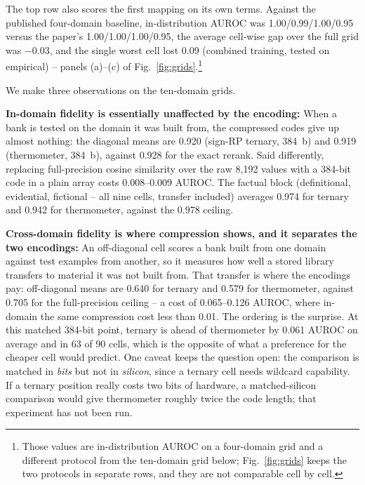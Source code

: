 \documentclass[conference]{IEEEtran}
\newcommand{\auroc}{{AUROC}\xspace}
\newcommand{\signrp}{{sign-RP}\xspace}
\begin{document}
The top row also scores the first mapping on its own terms. Against
the published four-domain baseline, in-distribution \auroc was
1.00/0.99/1.00/0.95 versus the paper's 1.00/1.00/1.00/0.95, the
average cell-wise gap over the full grid was $-0.03$, and the single
worst cell lost 0.09 (combined training, tested on empirical) --
panels (a)--(c) of Fig.~\ref{fig:grids}.\footnote{Those values are
in-distribution \auroc on a four-domain grid and a different protocol
from the ten-domain grid below; Fig.~\ref{fig:grids} keeps the two
protocols in separate rows, and they are not comparable cell by
cell.}

We make three observations on the ten-domain grids.

\textbf{In-domain fidelity is essentially unaffected by the encoding:}
When a bank is tested on the domain it was built from, the compressed
codes give up almost nothing: the diagonal means are 0.920 (\signrp
ternary, 384~b) and 0.919 (thermometer, 384~b), against 0.928 for the
exact rerank. Said differently, replacing full-precision cosine
similarity over the raw 8{,}192 values with a 384-bit code in a plain
array costs 0.008--0.009 \auroc. The factual block (definitional,
evidential, fictional -- all nine cells, transfer included) averages
0.974 for ternary and 0.942 for thermometer, against the 0.978
ceiling.

\textbf{Cross-domain fidelity is where compression shows, and it
separates the two encodings:} An off-diagonal cell scores a bank
built from one domain against test examples from another, so it
measures how well a stored library transfers to material it was not
built from. That transfer is where the encodings pay: off-diagonal
means are 0.640 for ternary and 0.579 for thermometer, against 0.705
for the full-precision ceiling -- a cost of 0.065--0.126 \auroc,
where in-domain the same compression cost less than 0.01. The
ordering is the surprise. At this matched 384-bit point, ternary is
ahead of thermometer by 0.061 \auroc on average and in 63 of 90
cells, which is the opposite of what a preference for the cheaper
cell would predict. One caveat keeps the question open: the
comparison is matched in \emph{bits} but not in \emph{silicon},
since a ternary cell needs wildcard capability. If a ternary position
really costs two bits of hardware, a matched-silicon comparison would
give thermometer roughly twice the code length; that experiment has
not been run.
\end{document}
